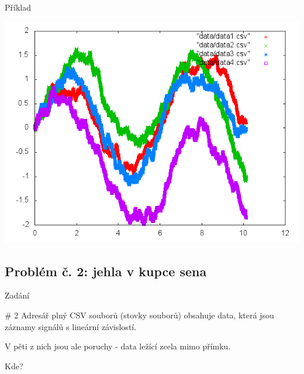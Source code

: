 \documentclass{beamer}
\begin{document}
\begin{frame}{Příklad}
  \begin{center}
      \includegraphics[width=0.6\columnwidth]{plot4}
      \end{center}

\end{frame}

\subsection{Problém č. 2: jehla v kupce sena}

\begin{frame}{Zadání}
  \begin{block}{\# 2}
    Adresář plný CSV souborů (stovky souborů) obsahuje data, která jsou záznamy signálů s lineární závislostí.

    V pěti z nich jsou ale poruchy - data ležící zcela mimo přímku.

    Kde?
  \end{block}
\end{frame}
\end{document}
